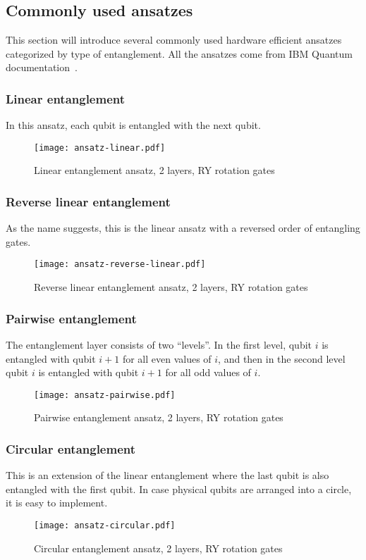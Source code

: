 \subsection{Commonly used ansatzes}\label{sec:ansatzes}
This section will introduce several commonly used hardware efficient ansatzes categorized by type of entanglement. All the ansatzes come from IBM Quantum documentation~\cite{twolocal}. 

\subsubsection{Linear entanglement}
In this ansatz, each qubit is entangled with the next qubit. 
\begin{figure}[H]
    \centering
    \texttt{[image: ansatz-linear.pdf]}
    \caption{Linear entanglement ansatz, 2 layers, RY rotation gates}
\end{figure}

\subsubsection{Reverse linear entanglement}
As the name suggests, this is the linear ansatz with a reversed order of entangling gates.
\begin{figure}[H]
    \centering
    \texttt{[image: ansatz-reverse-linear.pdf]}
    \caption{Reverse linear entanglement ansatz, 2 layers, RY rotation gates}
\end{figure}

\subsubsection{Pairwise entanglement}
The entanglement layer consists of two ``levels''. In the first level, qubit $i$ is entangled with qubit $i+1$ for all even values of $i$, and then in the second level qubit $i$ is entangled with qubit $i+1$ for all odd values of $i$. 
\begin{figure}[H]
    \centering
    \texttt{[image: ansatz-pairwise.pdf]}
    \caption{Pairwise entanglement ansatz, 2 layers, RY rotation gates}
\end{figure}

\subsubsection{Circular entanglement}
This is an extension of the linear entanglement where the last qubit is also entangled with the first qubit. In case physical qubits are arranged into a circle, it is easy to implement.
\begin{figure}[H]
    \centering
    \texttt{[image: ansatz-circular.pdf]}
    \caption{Circular entanglement ansatz, 2 layers, RY rotation gates}
\end{figure}

